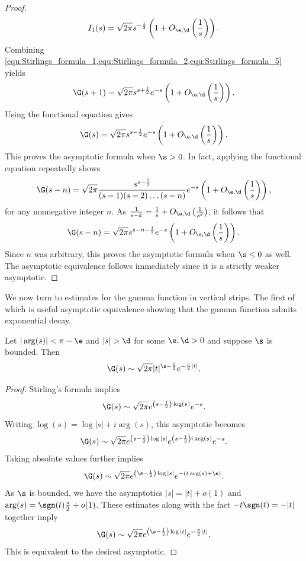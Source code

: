 \documentclass[12pt]{article}
\begin{document}
\begin{proof}
        \begin{equation}\label{equ:Stirlings_formula_5}
          I_{1}(s) = \sqrt{2\pi}s^{-\frac{1}{2}}\left(1+O_{\e,\d}\left(\frac{1}{s}\right)\right).
        \end{equation}
        Combining \cref{equ:Stirlings_formula_1,equ:Stirlings_formula_2,equ:Stirlings_formula_5} yields
        \[
          \G(s+1) = \sqrt{2\pi}s^{s+\frac{1}{2}}e^{-s}\left(1+O_{\e,\d}\left(\frac{1}{s}\right)\right).
        \]
        Using the functional equation gives
        \[
          \G(s) = \sqrt{2\pi}s^{s-\frac{1}{2}}e^{-s}\left(1+O_{\e,\d}\left(\frac{1}{s}\right)\right).
        \]
        This proves the asymptotic formula when \(\s > 0\). In fact, applying the functional equation repeatedly shows
        \[
          \G(s-n) = \sqrt{2\pi}\frac{s^{s-\frac{1}{2}}}{(s-1)(s-2) \ldots (s-n)}e^{-s}\left(1+O_{\e,\d}\left(\frac{1}{s}\right)\right),
        \]
        for any nonnegative integer \(n\). As \(\frac{1}{s-k} = \frac{1}{s}+O_{\e,\d}\left(\frac{1}{s^{2}}\right)\), it follows that
        \[
          \G(s-n) = \sqrt{2\pi}s^{s-n-\frac{1}{2}}e^{-s}\left(1+O_{\e,\d}\left(\frac{1}{s}\right)\right).
        \]
        Since \(n\) was arbitrary, this proves the asymptotic formula when \(\s \le 0\) as well. The asymptotic equivalence follows immediately since it is a strictly weaker asymptotic.
      \end{proof}

      We now turn to estimates for the gamma function in vertical strips. The first of which is useful asymptotic equivalence showing that the gamma function admits exponential decay.

      \begin{corollary}\label{equ:weaker_Stirling_formula_1}
        Let \(|\arg(s)| < \pi-\e\) and \(|s| > \d\) for some \(\e,\d > 0\) and suppose \(\s\) is bounded. Then
        \[
          \G(s) \sim \sqrt{2\pi}|t|^{\s-\frac{1}{2}}e^{-\frac{\pi}{2}|t|}.
        \]
      \end{corollary}
      \begin{proof}
        Stirling's formula implies
        \[
          \G(s) \sim \sqrt{2\pi}e^{\left(s-\frac{1}{2}\right)\log(s)}e^{-s}.
        \]
        Writing \(\log(s) = \log|s|+i\arg(s)\), this asymptotic becomes
        \[
          \G(s) \sim \sqrt{2\pi}e^{\left(s-\frac{1}{2}\right)\log|s|}e^{\left(s-\frac{1}{2}\right)i\arg(s)}e^{-s}.
        \]
        Taking absolute values further implies
        \[
          \G(s) \sim \sqrt{2\pi}e^{\left(\s-\frac{1}{2}\right)\log|s|}e^{-(t\arg(s)+\s)}.
        \]
        As \(\s\) is bounded, we have the asymptotics \(|s| = |t|+o(1)\) and \(\arg(s) = \sgn(t)\frac{\pi}{2}+o(1)\). These estimates along with the fact \(-t\sgn(t) = -|t|\) together imply
        \[
          \G(s) \sim \sqrt{2\pi}e^{\left(\s-\frac{1}{2}\right)\log|t|}e^{-\frac{\pi}{2}|t|}.
        \]
        This is equivalent to the desired asymptotic.
      \end{proof}
\end{document}
